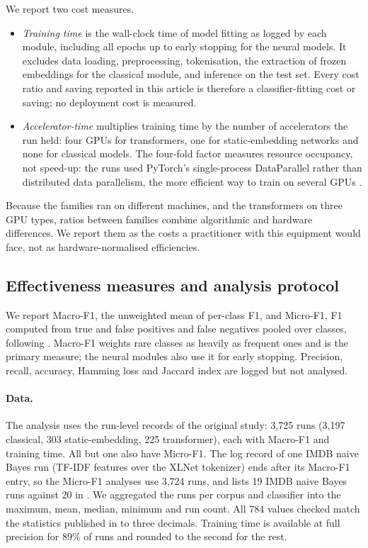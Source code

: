 \documentclass{ijis}
\begin{document}
We report two cost measures.
\begin{itemize}
\setlength\itemsep{1pt}
\item \emph{Training time} is the wall-clock time of model fitting as logged by each module, including all epochs up to early stopping for the neural models. It excludes data loading, preprocessing, tokenisation, the extraction of frozen embeddings for the classical module, and inference on the test set. Every cost ratio and saving reported in this article is therefore a classifier-fitting cost or saving; no deployment cost is measured.
\item \emph{Accelerator-time} multiplies training time by the number of accelerators the run held: four GPUs for transformers, one for static-embedding networks and none for classical models. The four-fold factor measures resource occupancy, not speed-up: the runs used PyTorch's single-process DataParallel rather than distributed data parallelism, the more efficient way to train on several GPUs \cite{li2020pytorchdistributedexperiencesaccelerating}.
\end{itemize}
Because the families ran on different machines, and the transformers on three GPU types, ratios between families combine algorithmic and hardware differences. We report them as the costs a practitioner with this equipment would face, not as hardware-normalised efficiencies.

\subsection{Effectiveness measures and analysis protocol}\label{sec:protocol}

We report Macro-F1, the unweighted mean of per-class F1, and Micro-F1, F1 computed from true and false positives and false negatives pooled over classes, following \cite{moreo2021}. Macro-F1 weights rare classes as heavily as frequent ones and is the primary measure; the neural modules also use it for early stopping. Precision, recall, accuracy, Hamming loss and Jaccard index are logged but not analysed.

\paragraph{Data.} The analysis uses the run-level records of the original study: 3,725 runs (3,197 classical, 303 static-embedding, 225 transformer), each with Macro-F1 and training time. All but one also have Micro-F1. The log record of one IMDB naive Bayes run (TF-IDF features over the XLNet tokenizer) ends after its Macro-F1 entry, so the Micro-F1 analyses use 3,724 runs, and  lists 19 IMDB naive Bayes runs against 20 in . We aggregated the runs per corpus and classifier into the maximum, mean, median, minimum and run count. All 784 values checked match the statistics published in \cite{worth2025layercake} to three decimals. Training time is available at full precision for 89\% of runs and rounded to the second for the rest.
\end{document}
